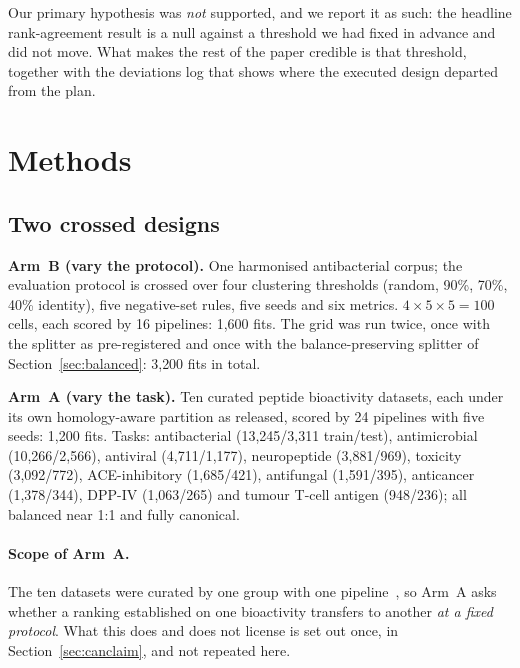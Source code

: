 \documentclass[11pt,a4paper]{article}
\begin{document}
Our primary hypothesis was \emph{not} supported, and we report it as such: the headline
rank-agreement result is a null against a threshold we had fixed in advance and did not
move. What makes the rest of the paper credible is that threshold, together with the
deviations log that shows where the executed design departed from the plan.

\section{Methods}

\subsection{Two crossed designs}

\textbf{Arm~B (vary the protocol).} One harmonised antibacterial corpus; the evaluation
protocol is crossed over four clustering thresholds (random, 90\%, 70\%, 40\% identity),
five negative-set rules, five seeds and six metrics. $4\times5\times5 = 100$ cells, each
scored by 16 pipelines: 1{,}600 fits. The grid was run twice, once with the splitter as
pre-registered and once with the balance-preserving splitter of
Section~\ref{sec:balanced}: 3{,}200 fits in total.

\textbf{Arm~A (vary the task).} Ten curated peptide bioactivity datasets, each under its
own homology-aware partition as released, scored by 24 pipelines with five seeds: 1{,}200
fits. Tasks: antibacterial (13{,}245/3{,}311 train/test), antimicrobial (10{,}266/2{,}566),
antiviral (4{,}711/1{,}177), neuropeptide (3{,}881/969), toxicity (3{,}092/772),
ACE-inhibitory (1{,}685/421), antifungal (1{,}591/395), anticancer (1{,}378/344), DPP-IV
(1{,}063/265) and tumour T-cell antigen (948/236); all balanced near 1:1 and fully
canonical.

\paragraph{Scope of Arm~A.} The ten datasets were curated by one group with one
pipeline~\citep{fernandezdiaz2024autopeptideml}, so Arm~A asks whether a ranking established
on one bioactivity transfers to another \emph{at a fixed protocol}. What this does and does
not license is set out once, in Section~\ref{sec:canclaim}, and not repeated here.
\end{document}
